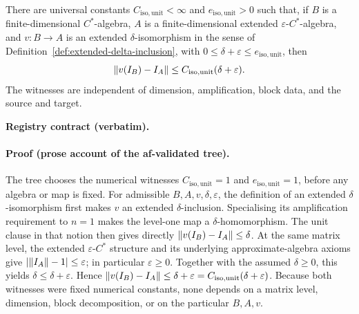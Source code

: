 \begin{lemma}\label{lem:maincb-isomorphism-unit-control}
There are universal constants $C_{\mathrm{iso,unit}}<\infty$ and
$e_{\mathrm{iso,unit}}>0$ such that, if $B$ is a finite-dimensional $C^*$-algebra,
$A$ is a finite-dimensional extended $\varepsilon$-$C^*$-algebra, and
$v:B\to A$ is an extended $\delta$-isomorphism in the sense of
Definition~\ref{def:extended-delta-inclusion}, with
$0\le\delta+\varepsilon\le e_{\mathrm{iso,unit}}$, then
\[
  \lVert v(I_B)-I_A\rVert\le C_{\mathrm{iso,unit}}(\delta+\varepsilon).
\]
The witnesses are independent of dimension, amplification, block data, and the source and target.
\end{lemma}
\noindent\textbf{Registry contract (verbatim).}
\paragraph{Proof (prose account of the af-validated tree).}
The tree chooses the numerical witnesses $C_{\mathrm{iso,unit}}=1$ and
$e_{\mathrm{iso,unit}}=1$, before any algebra or map is fixed.
For admissible $B,A,v,\delta,\varepsilon$, the definition of an extended
$\delta$-isomorphism first makes $v$ an extended $\delta$-inclusion.
Specialising its amplification requirement to $n=1$ makes the level-one map
a $\delta$-homomorphism.  The unit clause in that notion then gives directly
$\lVert v(I_B)-I_A\rVert\le\delta$.  At the same matrix level, the extended
$\varepsilon$-$C^*$ structure and its underlying approximate-algebra axioms give
$|\lVert I_A\rVert-1|\le\varepsilon$; in particular $\varepsilon\ge0$.
Together with the assumed $\delta\ge0$, this yields
$\delta\le\delta+\varepsilon$.  Hence
$\lVert v(I_B)-I_A\rVert\le\delta+\varepsilon
=C_{\mathrm{iso,unit}}(\delta+\varepsilon)$.
Because both witnesses were fixed numerical constants, none depends on a matrix
level, dimension, block decomposition, or on the particular $B,A,v$.

